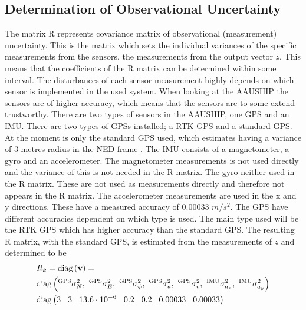 \subsection{Determination of Observational Uncertainty}
The matrix R represents covariance matrix of observational (measurement) uncertainty. This is the matrix which sets the individual variances of the specific measurements from the sensors, the measurements from the output vector $z$. This means that the coefficients of the R matrix can be determined within some interval. The disturbances of each sensor measurement highly depends on which sensor is implemented in the used system. When looking at the AAUSHIP the sensors are of higher accuracy, which means that the sensors are to some extend trustworthy. There are two types of sensors in the AAUSHIP, one \ac{GPS} and an \ac{IMU}. There are two types of \ac{GPS}s installed; a \ac{RTK} \ac{GPS} and a standard \ac{GPS}. At the moment is only the standard \ac{GPS} used, which estimates having a variance of 3 metres radius in the \ac{NED}-frame . The \ac{IMU} consists of a magnetometer, a gyro and an accelerometer. The magnetometer measurements is not used directly and the variance of this is not needed in the R matrix. The gyro neither used in the R matrix. These are not used as measurements directly and therefore not appears in the R matrix. The accelerometer measurements are used in the x and y directions. These have a measured accuracy of 0.00033 $m/s^2$. The \ac{GPS} have different accuracies dependent on which type is used. The main type used will be the \ac{RTK} \ac{GPS} which has higher accuracy than the standard \ac{GPS}. The resulting R matrix, with the standard \ac{GPS}, is estimated from the measurements of $z$ and determined to be
\begin{align}
&R_k = \diag{\mathbf{v}} =\\ \nonumber
&\diag{^\text{GPS}\sigma_{N}^2,\ ^\text{GPS}\sigma_{E}^2,\ ^\text{GPS}\sigma_{\psi}^2,\ ^\text{GPS}\sigma_{u}^2,\ ^\text{GPS}\sigma_{v}^2,\ ^\text{IMU}\sigma_{a_x}^2,\ ^\text{IMU}\sigma_{a_y}^2}\\ \nonumber
&\diag{3\hspace{3mm} 3\hspace{3mm} 13.6\cdot 10^{-6}\hspace{3mm} 0.2\hspace{3mm} 0.2\hspace{3mm} 0.00033\hspace{3mm} 0.00033}
\end{align}


